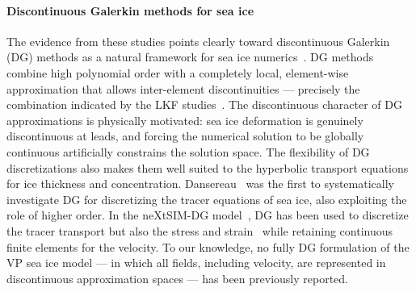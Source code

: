 \documentclass[11pt]{article}
\begin{document}
\paragraph{Discontinuous Galerkin methods for sea ice}

The evidence from these studies points clearly toward discontinuous Galerkin (DG) methods as a natural framework for sea ice numerics~\cite{di2011mathematical}. DG methods combine high polynomial order with a completely local, element-wise approximation that allows inter-element discontinuities — precisely the combination indicated by the LKF studies~\cite{MehlmannLKF2021}. The discontinuous character of DG approximations is physically motivated: sea ice deformation is genuinely discontinuous at leads, and forcing the numerical solution to be globally continuous artificially constrains the solution space. The flexibility of DG discretizations also makes them well suited to the hyperbolic transport equations for ice thickness and concentration. Dansereau~\cite{Dansereau2016,Dansereau2017,Dansereau2021} was the first to systematically investigate DG for discretizing the tracer equations of sea ice, also exploiting the role of higher order. In the neXtSIM-DG model~\cite{nextsimdg}, DG has been used to discretize the tracer transport but also the stress and strain~\cite{richter2023dynamical} while retaining continuous finite elements for the velocity. To our knowledge, no fully DG formulation of the VP sea ice model — in which all fields, including velocity, are represented in discontinuous approximation spaces — has been previously reported.

\end{document}
